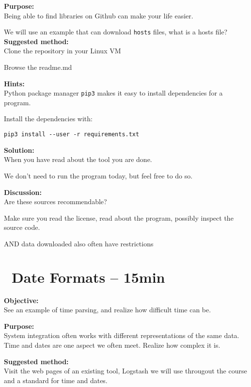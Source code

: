 \documentclass[a4paper,11pt,notitlepage]{report}
\begin{document}

{\bf Purpose:}\\
Being able to find libraries on Github can make your life easier.

We will use an example that can download \verb+hosts+ files, what is a hosts file?
{\bf Suggested method:}\\
Clone the repository in your Linux VM

Browse the readme.md

{\bf Hints:}\\
Python package manager \verb+pip3+ makes it easy to install dependencies for a program.

Install the dependencies with:

\begin{verbatim}
pip3 install --user -r requirements.txt
\end{verbatim}


{\bf Solution:}\\
When you have read about the tool you are done.

We don't need to run the program today, but feel free to do so.

{\bf Discussion:}\\
Are these sources recommendable?

Make sure you read the license, read about the program, possibly inspect the source code.

AND data downloaded also often have restrictions


\chapter{\faExclamationTriangle\ Date Formats -- 15min}
\label{ex:dateformats}


{\bf Objective:}\\
See an example of time parsing, and realize how difficult time can be.

{\bf Purpose:}\\
System integration often works with different representations of the same data. Time and dates are one aspect we often meet. Realize how complex it is.

{\bf Suggested method:}\\
Visit the web pages of an existing tool, Logstash we will use througout the course and a standard for time and dates.
\end{document}
